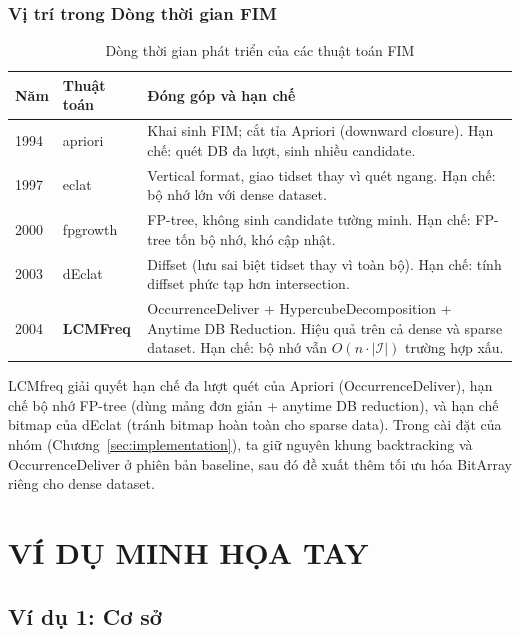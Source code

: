 \documentclass[12pt,a4paper]{article}
\theoremstyle{definition}
\begin{document}
\subsubsection{Vị trí trong Dòng thời gian FIM}

\begin{table}[H]
\centering
\small
\begin{tabular}{l l p{7.5cm}}
    \toprule
    \textbf{Năm} & \textbf{Thuật toán} & \textbf{Đóng góp và hạn chế} \\
    \midrule
    1994 & \gls{apriori}   & Khai sinh FIM; cắt tỉa Apriori (downward closure). Hạn chế: quét DB đa lượt, sinh nhiều candidate. \\
    1997 & \gls{eclat}     & Vertical format, giao tidset thay vì quét ngang. Hạn chế: bộ nhớ lớn với dense dataset. \\
    2000 & \gls{fpgrowth}  & FP-tree, không sinh candidate tường minh. Hạn chế: FP-tree tốn bộ nhớ, khó cập nhật. \\
    2003 & dEclat          & Diffset (lưu sai biệt tidset thay vì toàn bộ). Hạn chế: tính diffset phức tạp hơn intersection. \\
    2004 & \textbf{LCMFreq} & OccurrenceDeliver + HypercubeDecomposition + Anytime DB Reduction. Hiệu quả trên cả dense và sparse dataset. Hạn chế: bộ nhớ vẫn $O(n \cdot |\mathcal{I}|)$ trường hợp xấu. \\
    \bottomrule
\end{tabular}
\caption{Dòng thời gian phát triển của các thuật toán FIM}
\label{tab:timeline}
\end{table}

LCMfreq giải quyết hạn chế đa lượt quét của Apriori (OccurrenceDeliver), hạn chế bộ nhớ FP-tree (dùng mảng đơn giản + anytime DB reduction), và hạn chế bitmap của dEclat (tránh bitmap hoàn toàn cho sparse data). Trong cài đặt của nhóm (Chương~\ref{sec:implementation}), ta giữ nguyên khung backtracking và OccurrenceDeliver ở phiên bản baseline, sau đó đề xuất thêm tối ưu hóa BitArray riêng cho dense dataset.


\section{VÍ DỤ MINH HỌA TAY}

\subsection{Ví dụ 1: Cơ sở}
\label{subsec:ex1}
\end{document}
